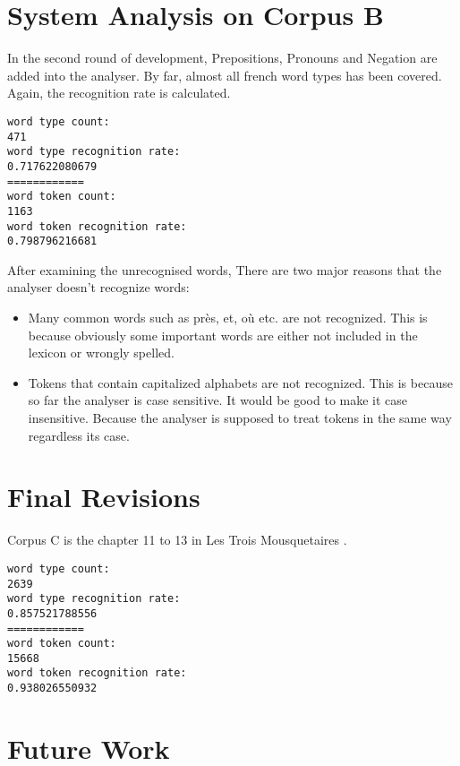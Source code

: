 \documentclass[11pt,letterpaper]{article}
\begin{document}
\section{System Analysis on Corpus B}
In the second round of development, Prepositions, Pronouns and Negation are added into the analyser. By far, almost all french word types has been covered. Again, the recognition rate is calculated.\\

\begin{verbatim}
word type count:
471
word type recognition rate:
0.717622080679
============
word token count:
1163
word token recognition rate:
0.798796216681
\end{verbatim} 
After examining the unrecognised words, There are two major reasons that the analyser doesn't recognize words:\\
\begin{itemize}
\item Many common words such as pr\`es, et, o\`u etc. are not recognized. This is because obviously some important words are either not included in the lexicon or wrongly spelled.
\item Tokens that contain capitalized alphabets are not recognized. This is because so far the analyser is case sensitive. It would be good to make it case insensitive. Because the analyser is supposed to treat tokens in the same way regardless its case.
\end{itemize}
\section{Final Revisions}
Corpus C is the chapter 11 to 13 in Les Trois Mousquetaires  .\\
\begin{verbatim}
word type count:
2639
word type recognition rate:
0.857521788556
============
word token count:
15668
word token recognition rate:
0.938026550932
\end{verbatim} 
\section{Future Work}



\label{lastpage}
\end{document}
